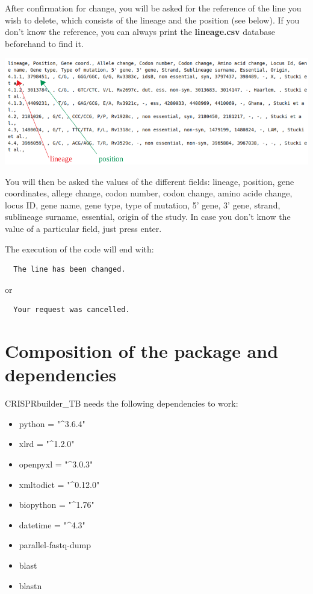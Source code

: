 \documentclass[twoside,a4paper,11pt,frenchb,openany]{report}
\begin{document}
After confirmation for change, you will be asked for the reference of
the line you wish to delete, which consists of the lineage and the
position (see below). If you don't know the reference, you can always
print the \textbf{lineage.csv} database beforehand to find it.

\includegraphics[width=16cm]{selection.png}

    You will then be asked the values of the different fields: lineage,
position, gene coordinates, allege change, codon number, codon change,
amino acide change, locus ID, gene name, gene type, type of mutation, 5'
gene, 3' gene, strand, sublineage surname, essential, origin of the
study. In case you don't know the value of a particular field, just
press enter.

    The execution of the code will end with:

    \begin{verbatim}
  The line has been changed.
\end{verbatim}

    or

    \begin{verbatim}
  Your request was cancelled.
\end{verbatim}


    \section{Composition of the package and
dependencies}\label{composition-of-the-package-and-dependencies}

    CRISPRbuilder\_TB needs the following dependencies to work:

\begin{itemize}
\item
  python = "\^{}3.6.4"
\item
  xlrd = "\^{}1.2.0"
\item
  openpyxl = "\^{}3.0.3"
\item
  xmltodict = "\^{}0.12.0"
\item
  biopython = "\^{}1.76"
\item
  datetime = "\^{}4.3"
\item
  parallel-fastq-dump
\item
  blast
\item
  blastn
\end{itemize}
\end{document}

